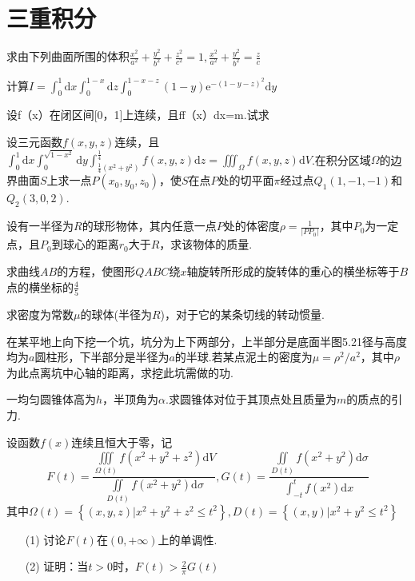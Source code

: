 \section{三重积分}
\begin{xiti}
	\item 	求由下列曲面所围的体积$
	\frac{x^{2}}{a^{2}}+\frac{y^{2}}{b^{2}}+\frac{z^{2}}{c^{2}}=1, \frac{x^{2}}{a^{2}}+\frac{y^{2}}{b^{2}}=\frac{z}{c}$
	\item 计算$
	I=\int_{0}^{1} \mathrm{d} x \int_{0}^{1-x} \mathrm{d} z \int_{0}^{1-x-z}(1-y) \mathrm{e}^{-(1-y-z)^{2}} \mathrm{d} y$
	\item 设f（x）在闭区间[0，1]上连续，且ff（x）dx=m.试求
	\item 设三元函数$f(x,y,z)$连续，且$\int_{0}^{1} \mathrm{d} x \int_{0}^{\sqrt{1-x^{2}}} \mathrm{d} y \int_{\frac{1}{4}\left(x^{2}+y^{2}\right)}^{\frac{1}{4}} f(x, y, z) \mathrm{d} z=\iiint_{\Omega} f(x, y, z) \mathrm{d} V$.在积分区域$\Omega$的边界曲面$S$上求一点$P\left(x_{0}, y_{0}, z_{0}\right)$，使$S$在点$P$处的切平面$\pi$经过点$Q_{1}(1,-1,-1)$和$Q_{2}(3,0,2)$.
	
	\item 设有一半径为$R$的球形物体，其内任意一点$P$处的体密度$\rho=\frac{1}{\left|P P_{0}\right|}$，其中$P_{0}$为一定点，且$P_{0}$到球心的距离$r_{0}$大于$R$，求该物体的质量.
	\item 求曲线$AB$的方程，使图形$QABC$绕$x$轴旋转所形成的旋转体的重心的横坐标等于$B$点的横坐标的$\frac{4}{5}$
	\item 求密度为常数$\mu $的球体(半径为$R$)，对于它的某条切线的转动惯量.
	\item 在某平地上向下挖一个坑，坑分为上下两部分，上半部分是底面半图5.21径与高度均为$a$圆柱形，下半部分是半径为$a$的半球.若某点泥土的密度为$ \mu=\rho^{2} / a^{2}$，其中$\rho$为此点离坑中心轴的距离，求挖此坑需做的功.
	
	\item 一均匀圆锥体高为$h$，半顶角为$\alpha$.求圆锥体对位于其顶点处且质量为$m$的质点的引力.
	
	\item 设函数$f(x)$连续且恒大于零，记
	\[
	F\left(t\right)=\frac{\iiint\limits_{\Omega\left(t\right)}{f\left(x^2+y^2+z^2\right)\textrm{d}V}}{\iint\limits_{D\left(t\right)}{f\left(x^2+y^2\right)\textrm{d}\sigma}},G\left(t\right)=\frac{\iint\limits_{D\left(t\right)}{f\left(x^2+y^2\right)\textrm{d}\sigma}}{\int_{-t}^t{f\left(x^2\right)\textrm{d}x}}
	\]
	其中$
	\Omega(t)=\left\{(x, y, z) | x^{2}+y^{2}+z^{2} \leqslant t^{2}\right\}, D(t)=\left\{(x, y) | x^{2}+y^{2} \leqslant t^{2}\right\}$
	\begin{enumerate}
		\item [(1)]讨论$F(t)$在$(0,+\infty)$上的单调性.
		\item [(2)]证明：当$t>0$时，$F(t)>\frac{2}{\pi} G(t)$
	\end{enumerate}
\end{xiti}


